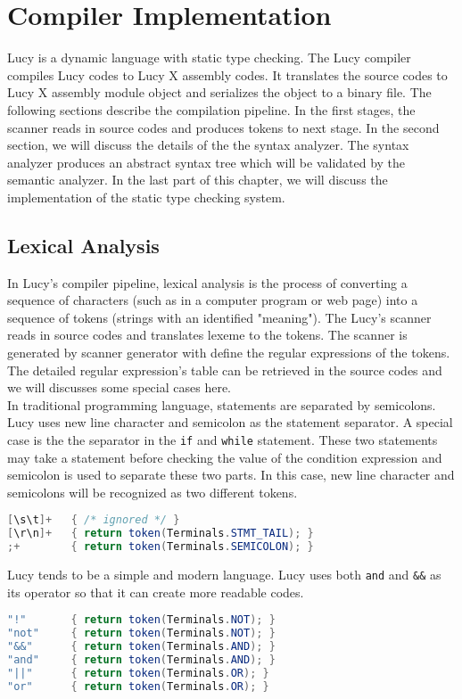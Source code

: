 \chapter{Compiler Implementation}
Lucy is a dynamic language with static type checking. The Lucy compiler compiles Lucy codes to Lucy X assembly codes. It translates the source codes to Lucy X assembly module object and serializes the object to a binary file. The following sections describe the compilation pipeline. In the first stages, the scanner reads in source codes and produces tokens to next stage. In the second section, we will discuss the details of the the syntax analyzer. The syntax analyzer produces an abstract syntax tree which will be validated by the semantic analyzer. In the last part of this chapter, we will discuss the implementation of the static type checking system.


\section{Lexical Analysis}
In Lucy's compiler pipeline, lexical analysis is the process of converting a sequence of characters (such as in a computer program or web page) into a sequence of tokens (strings with an identified "meaning"). The Lucy's scanner reads in source codes and translates lexeme to the tokens. The scanner is generated by scanner generator with define the regular expressions of the tokens. The detailed regular expression's table can be retrieved in the source codes and we will discusses some special cases here. \\
In traditional programming language, statements are separated by semicolons. Lucy uses new line character and semicolon as the statement separator. A special case is the the separator in the \texttt{if} and \texttt{while} statement. These two statements may take a statement before checking the value of the condition expression and semicolon is used to separate these two parts. In this case, new line character and semicolons will be recognized as two different tokens.
\begin{lstlisting}[language=java]
[\s\t]+   { /* ignored */ }
[\r\n]+   { return token(Terminals.STMT_TAIL); }
;+        { return token(Terminals.SEMICOLON); }
\end{lstlisting}
Lucy tends to be a simple and modern language. Lucy uses both \texttt{and} and \texttt{\&\&} as its operator so that it can create more readable codes.
\begin{lstlisting}[language=java]
"!"       { return token(Terminals.NOT); }
"not"     { return token(Terminals.NOT); }
"&&"      { return token(Terminals.AND); }
"and"     { return token(Terminals.AND); }
"||"      { return token(Terminals.OR); }
"or"      { return token(Terminals.OR); }
\end{lstlisting}

